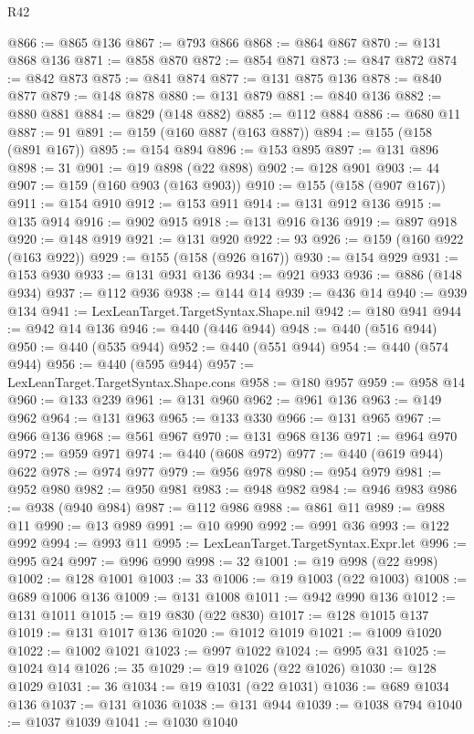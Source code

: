 \begin{lexlean}{R42}
\begin{coremodule}
@866 := @865 @136
@867 := @793 @866
@868 := @864 @867
@870 := @131 @868 @136
@871 := @858 @870
@872 := @854 @871
@873 := @847 @872
@874 := @842 @873
@875 := @841 @874
@877 := @131 @875 @136
@878 := @840 @877
@879 := @148 @878
@880 := @131 @879
@881 := @840 @136
@882 := @880 @881
@884 := @829 (@148 @882)
@885 := @112 @884
@886 := @680 @11
@887 := 91
@891 := @159 (@160 @887 (@163 @887))
@894 := @155 (@158 (@891 @167))
@895 := @154 @894
@896 := @153 @895
@897 := @131 @896
@898 := 31
@901 := @19 @898 (@22 @898)
@902 := @128 @901
@903 := 44
@907 := @159 (@160 @903 (@163 @903))
@910 := @155 (@158 (@907 @167))
@911 := @154 @910
@912 := @153 @911
@914 := @131 @912 @136
@915 := @135 @914
@916 := @902 @915
@918 := @131 @916 @136
@919 := @897 @918
@920 := @148 @919
@921 := @131 @920
@922 := 93
@926 := @159 (@160 @922 (@163 @922))
@929 := @155 (@158 (@926 @167))
@930 := @154 @929
@931 := @153 @930
@933 := @131 @931 @136
@934 := @921 @933
@936 := @886 (@148 @934)
@937 := @112 @936
@938 := @144 @14
@939 := @436 @14
@940 := @939 @134
@941 := LexLeanTarget.TargetSyntax.Shape.nil
@942 := @180 @941
@944 := @942 @14 @136
@946 := @440 (@446 @944)
@948 := @440 (@516 @944)
@950 := @440 (@535 @944)
@952 := @440 (@551 @944)
@954 := @440 (@574 @944)
@956 := @440 (@595 @944)
@957 := LexLeanTarget.TargetSyntax.Shape.cons
@958 := @180 @957
@959 := @958 @14
@960 := @133 @239
@961 := @131 @960
@962 := @961 @136
@963 := @149 @962
@964 := @131 @963
@965 := @133 @330
@966 := @131 @965
@967 := @966 @136
@968 := @561 @967
@970 := @131 @968 @136
@971 := @964 @970
@972 := @959 @971
@974 := @440 (@608 @972)
@977 := @440 (@619 @944) @622
@978 := @974 @977
@979 := @956 @978
@980 := @954 @979
@981 := @952 @980
@982 := @950 @981
@983 := @948 @982
@984 := @946 @983
@986 := @938 (@940 @984)
@987 := @112 @986
@988 := @861 @11
@989 := @988 @11
@990 := @13 @989
@991 := @10 @990
@992 := @991 @36
@993 := @122 @992
@994 := @993 @11
@995 := LexLeanTarget.TargetSyntax.Expr.let
@996 := @995 @24
@997 := @996 @990
@998 := 32
@1001 := @19 @998 (@22 @998)
@1002 := @128 @1001
@1003 := 33
@1006 := @19 @1003 (@22 @1003)
@1008 := @689 @1006 @136
@1009 := @131 @1008
@1011 := @942 @990 @136
@1012 := @131 @1011
@1015 := @19 @830 (@22 @830)
@1017 := @128 @1015 @137
@1019 := @131 @1017 @136
@1020 := @1012 @1019
@1021 := @1009 @1020
@1022 := @1002 @1021
@1023 := @997 @1022
@1024 := @995 @31
@1025 := @1024 @14
@1026 := 35
@1029 := @19 @1026 (@22 @1026)
@1030 := @128 @1029
@1031 := 36
@1034 := @19 @1031 (@22 @1031)
@1036 := @689 @1034 @136
@1037 := @131 @1036
@1038 := @131 @944
@1039 := @1038 @794
@1040 := @1037 @1039
@1041 := @1030 @1040

\end{coremodule}
\end{lexlean}
